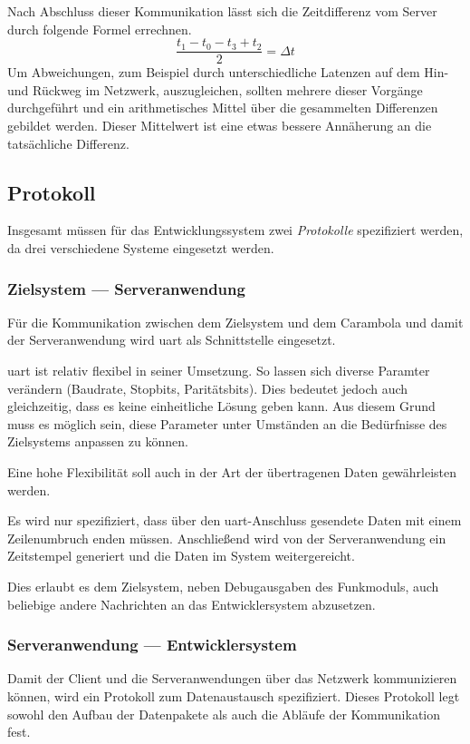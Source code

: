 Nach Abschluss dieser Kommunikation lässt sich die Zeitdifferenz vom Server
durch folgende Formel errechnen.
\begin{equation}
\frac{t_1-t_0-t_3+t_2}{2}=\Delta t
\end{equation}
Um Abweichungen, zum Beispiel durch unterschiedliche Latenzen auf dem Hin- und
Rückweg im Netzwerk, auszugleichen, sollten mehrere dieser Vorgänge durchgeführt
und ein arithmetisches Mittel über die gesammelten Differenzen gebildet werden.
Dieser Mittelwert ist eine etwas bessere Annäherung an die tatsächliche
Differenz.

\subsection{Protokoll}
Insgesamt müssen für das Entwicklungssystem zwei \emph{Protokolle} spezifiziert
werden, da drei verschiedene Systeme eingesetzt werden.

\subsubsection*{Zielsystem --- Serveranwendung}
Für die Kommunikation zwischen dem Zielsystem und dem Carambola und damit der
Serveranwendung wird \gls{uart} als Schnittstelle eingesetzt.

\gls{uart} ist relativ flexibel in seiner Umsetzung. So lassen sich
diverse Paramter verändern (Baudrate, Stopbits, Paritätsbits). Dies
bedeutet jedoch auch gleichzeitig, dass es keine einheitliche Lösung geben kann.
Aus diesem Grund muss es möglich sein, diese Parameter unter Umständen an die
Bedürfnisse des Zielsystems anpassen zu können.

Eine hohe Flexibilität soll auch in der Art der übertragenen Daten
gewährleisten werden.

Es wird nur spezifiziert, dass über den \gls{uart}-Anschluss
gesendete Daten mit einem Zeilenumbruch enden müssen. Anschließend wird von der
Serveranwendung ein Zeitstempel generiert und die Daten im System
weitergereicht.

Dies erlaubt es dem Zielsystem, neben Debugausgaben des Funkmoduls, auch
beliebige andere Nachrichten an das Entwicklersystem abzusetzen.

\subsubsection*{Serveranwendung --- Entwicklersystem}
Damit der Client und die Serveranwendungen über das Netzwerk kommunizieren
können, wird ein Protokoll zum Datenaustausch spezifiziert. Dieses Protokoll
legt sowohl den Aufbau der Datenpakete als auch die Abläufe der Kommunikation
fest.

